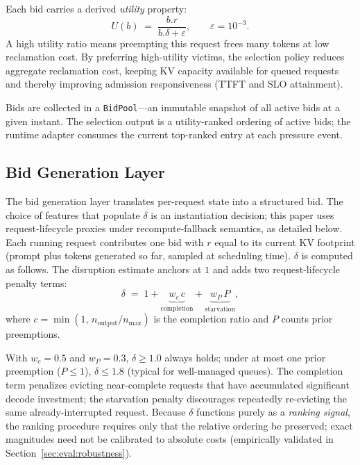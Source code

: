 \documentclass[sigconf,nonacm]{acmart}
\newcommand{\utilfn}{\ensuremath{U}}
\newcommand{\tokfree}{\ensuremath{r}}
\newcommand{\qualdelta}{\ensuremath{\delta}}
\newcommand{\stabeps}{\ensuremath{\varepsilon}}
\begin{document}
Each bid carries a derived \emph{utility} property:
\begin{equation}\label{eq:utility}
  \utilfn(b) \;=\; \frac{b.\tokfree}{b.\qualdelta + \stabeps},
  \qquad \stabeps = 10^{-3}.
\end{equation}
A high utility ratio means preempting this request frees many tokens at low
reclamation cost.  By preferring high-utility victims, the selection policy reduces
aggregate reclamation cost, keeping KV capacity available for queued
requests and thereby improving admission responsiveness
(TTFT and SLO attainment).

Bids are collected in a \texttt{BidPool}---an immutable snapshot of all active
bids at a given instant.  The selection output is a utility-ranked ordering of
active bids; the runtime adapter consumes the current top-ranked entry at each
pressure event.

\subsection{Bid Generation Layer}\label{sec:design:scoring}

The bid generation layer translates per-request state into a structured bid.
The choice of features that populate $\qualdelta$ is an instantiation decision;
this paper uses request-lifecycle proxies under recompute-fallback semantics,
as detailed below.  Each running request contributes one bid with
$\tokfree$ equal to its current KV footprint (prompt plus tokens generated
so far, sampled at scheduling time).  $\qualdelta$ is computed as follows.
The disruption estimate anchors at $1$ and adds two
request-lifecycle penalty terms:
\begin{equation}\label{eq:delta}
  \qualdelta \;=\; 1
    + \underbrace{w_c\, c}_{\text{completion}}
    + \underbrace{w_P\, P}_{\text{starvation}},
\end{equation}
where $c{=}\min(1,\, n_{\text{output}}/n_{\max})$ is the completion
ratio and $P$ counts prior preemptions.

With $w_c{=}0.5$ and $w_P{=}0.3$, $\qualdelta \geq 1.0$ always holds;
under at most one prior preemption ($P{\leq}1$), $\qualdelta \leq 1.8$
(typical for well-managed queues).
The completion term penalizes evicting near-complete requests that have
accumulated significant decode investment; the starvation penalty
discourages repeatedly re-evicting the same already-interrupted request.
Because $\qualdelta$ functions purely as a \emph{ranking signal}, the
ranking procedure requires only that the relative ordering be preserved; exact
magnitudes need not be calibrated to absolute costs
(empirically validated in Section~\ref{sec:eval:robustness}).
\end{document}
